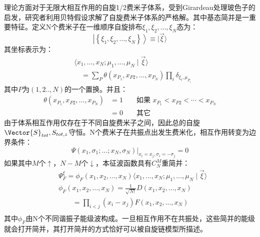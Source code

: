 理论方面对于无限大相互作用的自旋1/2费米子体系，受到Girardeau处理玻色子的启发，研究者利用贝特假设求解了自旋费米子体系的严格解\cite{Guan2009exact}。其中基态简并是一重要特征。定义N个费米子在一维顺序自旋排布$\xi_{1}, \xi_{2}, \ldots, \xi_{N}$态为：
\begin{equation}
\left|\left\{\xi_{1}, \xi_{2}, \ldots, \xi_{N}\right\}\right\rangle \equiv|\vec{\xi}\rangle
\end{equation}
其坐标表示为：
\begin{equation}
\begin{aligned}
&\langle x_{1}, \ldots, x_{N} ; \mu_{1}, \ldots, \mu_{N} \mid \vec{\xi}\rangle \\
&\quad=\sum_{P} \theta\left(x_{P_{1}}, x_{P 2}, \ldots, x_{P_{N}}\right) \prod_{i} \delta_{\xi_{i}, \mu_{P_{i}}}
\end{aligned}
\end{equation}
其中$P$为$(1,2..,N)$的一个置换。并且：
\begin{equation}
\begin{aligned}
\theta\left(x_{P_{1}}, x_{P 2}, \ldots, x_{P_{N}}\right) &=1 & & \text { 如果 } x_{P_{1}}<x_{P 2}<\cdots<x_{P_{N}} \\
&=0 & & \text { 其它 }
\end{aligned}
\end{equation}
由于体系相互作用仅存在于不同自旋费米子之间，因此总的自旋$\Vector{S}_{tot},S_{tot,z}$守恒。N个费米子在共振点出发生费米化，相互作用转变为边界条件：
\begin{equation}
\left.\Psi\left(x_{1}, \sigma_{1} ; \ldots ; x_{N}, \sigma_{N}\right)\right|_{x_{i}=x_{j}, \sigma_{i}=-\sigma_{j}}=0
\end{equation}
如果其中$M$个$\uparrow$，$N-M$个$\downarrow$，本征波函数具有$C_N^M$重简并：
\begin{equation}
\begin{split}
&\Psi_{F}^{\xi}=\phi_{F}\left(x_{1}, x_{2}, \ldots, x_{N}\right)\langle x_{1}, \ldots, x_{N} ; \mu_{1}, \ldots, \mu_{N} \mid \vec{\xi}\rangle\\
&\phi_{F}\left(x_{1}, x_{2}, \ldots, x_{N}\right) =\frac{1}{\sqrt{N !}} D\left(x_{1}, x_{2}, \ldots, x_{N}\right) \\
&\quad\quad =\prod_{i<j}\left(x_{i}-x_{j}\right) F\left(x_{1}, x_{2}, \ldots, x_{N}\right)\\
\end{split}
\end{equation}
其中$\phi_F$由N个不同谐振子能级波构成。一旦相互作用不在共振处，这些简并的能级就会打开简并，其打开简并的方式恰好可以被自旋链模型所描述。
